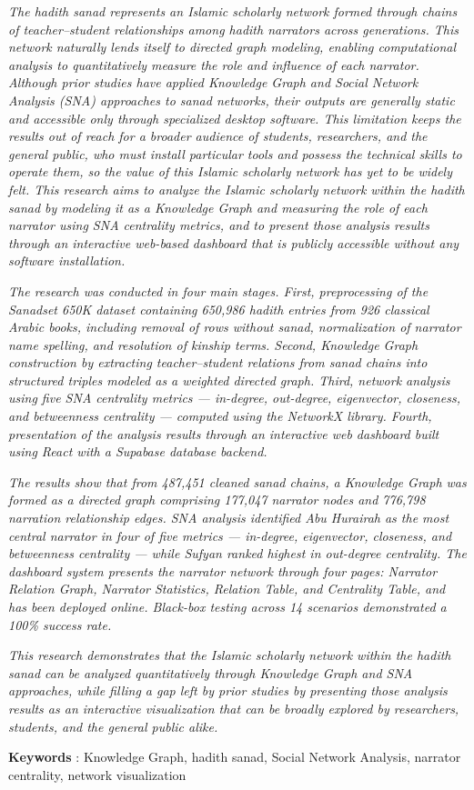 \textit{
The hadith sanad represents an Islamic scholarly network formed through chains of teacher--student relationships among hadith narrators across generations. This network naturally lends itself to directed graph modeling, enabling computational analysis to quantitatively measure the role and influence of each narrator. Although prior studies have applied Knowledge Graph and Social Network Analysis (SNA) approaches to sanad networks, their outputs are generally static and accessible only through specialized desktop software. This limitation keeps the results out of reach for a broader audience of students, researchers, and the general public, who must install particular tools and possess the technical skills to operate them, so the value of this Islamic scholarly network has yet to be widely felt. This research aims to analyze the Islamic scholarly network within the hadith sanad by modeling it as a Knowledge Graph and measuring the role of each narrator using SNA centrality metrics, and to present those analysis results through an interactive web-based dashboard that is publicly accessible without any software installation.
}

\textit{
The research was conducted in four main stages. First, preprocessing of the Sanadset 650K dataset containing 650,986 hadith entries from 926 classical Arabic books, including removal of rows without sanad, normalization of narrator name spelling, and resolution of kinship terms. Second, Knowledge Graph construction by extracting teacher--student relations from sanad chains into structured triples modeled as a weighted directed graph. Third, network analysis using five SNA centrality metrics — in-degree, out-degree, eigenvector, closeness, and betweenness centrality — computed using the NetworkX library. Fourth, presentation of the analysis results through an interactive web dashboard built using React with a Supabase database backend.
}

\textit{
The results show that from 487,451 cleaned sanad chains, a Knowledge Graph was formed as a directed graph comprising 177,047 narrator nodes and 776,798 narration relationship edges. SNA analysis identified Abu Hurairah as the most central narrator in four of five metrics — in-degree, eigenvector, closeness, and betweenness centrality — while Sufyan ranked highest in out-degree centrality. The dashboard system presents the narrator network through four pages: Narrator Relation Graph, Narrator Statistics, Relation Table, and Centrality Table, and has been deployed online. Black-box testing across 14 scenarios demonstrated a 100\% success rate.
}

\textit{
This research demonstrates that the Islamic scholarly network within the hadith sanad can be analyzed quantitatively through Knowledge Graph and SNA approaches, while filling a gap left by prior studies by presenting those analysis results as an interactive visualization that can be broadly explored by researchers, students, and the general public alike.
}

\vspace{0.5cm}
\noindent\textbf{Keywords} : Knowledge Graph, hadith sanad, Social Network Analysis, narrator centrality, network visualization
